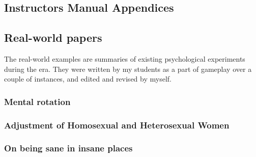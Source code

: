 \begin{refsection}
\pagebreak 

 \renewcommand*{\thechapter}{}
\renewcommand*{\thesection}{\Alph{section}}
\setcounter{chapter}{0}
\renewcommand*{\thesubsection}{\arabic{subsection}}



\chapter{Instructors Manual Appendices}
\label{instructorsmanualappendices}

\begin{appendices}
\let\svaddcontentsline\addcontentsline
\renewcommand\addcontentsline[3]{%
  \ifthenelse{\equal{#1}{lof}}{}%
  {\ifthenelse{\equal{#1}{lot}}{}{\svaddcontentsline{#1}{#2}{#3}}}}





\section{Real-world papers}
\label{real-worldpapers}

The real-world examples are summaries of existing psychological experiments during the era. They were written by my students as a part of gameplay over a couple of instances, and edited and revised by myself.

\subsection{Mental rotation}
\label{mentalrotation}

\label{paper: mentalrotation}


\subsection{Adjustment of Homosexual and Heterosexual Women}
\label{adjustmentofhomosexualandheterosexualwomen}

\label{paper: observation}


\subsection{On being sane in insane places}
\label{onbeingsaneininsaneplaces}


\end{appendices}
\end{refsection}
